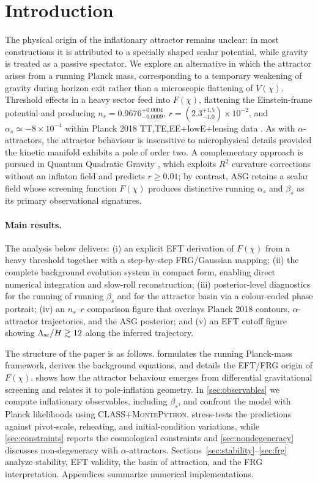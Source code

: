 \documentclass[11pt,a4paper]{article}
\begin{document}
\section{Introduction}
\label{sec:intro}
The physical origin of the inflationary attractor remains unclear: in most constructions it is attributed to a specially shaped scalar potential, while gravity is treated as a passive spectator. We explore an alternative in which the attractor arises from a running Planck mass, corresponding to a temporary weakening of gravity during horizon exit rather than a microscopic flattening of $V(\chi)$. Threshold effects in a heavy sector feed into $F(\chi)$, flattening the Einstein-frame potential and producing $n_s=0.9676^{+0.0004}_{-0.0009}$, $r=(2.3^{+1.5}_{-1.0})\times10^{-2}$, and $\alpha_s\simeq-8\times10^{-4}$ within Planck 2018 TT,TE,EE+lowE+lensing data \cite{Planck2018}. As with $\alpha$-attractors, the attractor behaviour is insensitive to microphysical details provided the kinetic manifold exhibits a pole of order two.
A complementary approach is pursued in Quantum Quadratic Gravity \cite{Liu2026}, which exploits $R^2$ curvature corrections without an inflaton field and predicts $r\ge0.01$; by contrast, ASG retains a scalar field whose screening function $F(\chi)$ produces distinctive running $\alpha_s$ and $\beta_s$ as its primary observational signatures.

\paragraph{Main results.} The analysis below delivers: (i) an explicit EFT derivation of $F(\chi)$ from a heavy threshold together with a step-by-step FRG/Gaussian mapping; (ii) the complete background evolution system in compact form, enabling direct numerical integration and slow-roll reconstruction; (iii) posterior-level diagnostics for the running of running $\beta_s$ and for the attractor basin via a colour-coded phase portrait; (iv) an $n_s$--$r$ comparison figure that overlays Planck 2018 contours, $\alpha$-attractor trajectories, and the ASG posterior; and (v) an EFT cutoff figure showing $\Lambda_{\rm sc}/H \gtrsim 12$ along the inferred trajectory.

The structure of the paper is as follows.  formulates the running Planck-mass framework, derives the background equations, and details the EFT/FRG origin of $F(\chi)$.  shows how the attractor behaviour emerges from differential gravitational screening and relates it to pole-inflation geometry. In \cref{sec:observables} we compute inflationary observables, including $\beta_s$, and confront the model with Planck likelihoods using \textsc{CLASS}+\textsc{MontePython}.  stress-tests the predictions against pivot-scale, reheating, and initial-condition variations, while \cref{sec:constraints} reports the cosmological constraints and \cref{sec:nondegeneracy} discusses non-degeneracy with $\alpha$-attractors. Sections~\ref{sec:stability}--\ref{sec:frg} analyze stability, EFT validity, the basin of attraction, and the FRG interpretation. Appendices summarize numerical implementations.
\end{document}
